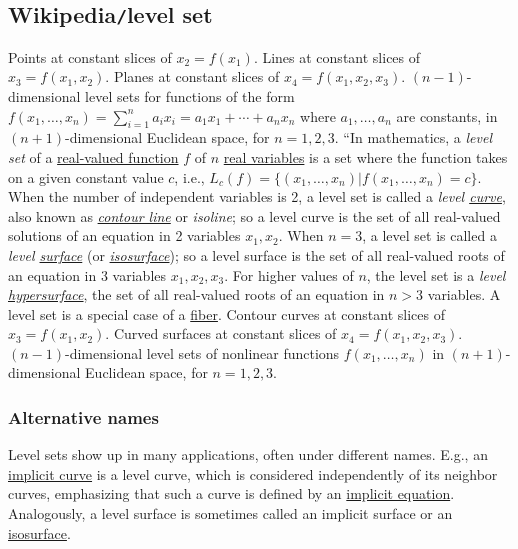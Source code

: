 \documentclass{article}
\begin{document}

\subsection{Wikipedia{\tt/}level set}
{\sf Points at constant slices of $x_2 = f(x_1)$. Lines at constant slices of $x_3 = f(x_1,x_2)$. Planes at constant slices of $x_4 = f(x_1,x_2,x_3)$. $(n - 1)$-dimensional level sets for functions of the form $f(x_1,\ldots,x_n) = \sum_{i=1}^n a_ix_i = a_1x_1 + \cdots + a_nx_n$ where $a_1,\ldots,a_n$ are constants, in $(n + 1)$-dimensional Euclidean space, for $n = 1,2,3$.} ``In mathematics, a {\it level set} of a \href{https://en.wikipedia.org/wiki/Real-valued_function}{real-valued function} $f$ of $n$ \href{https://en.wikipedia.org/wiki/Function_of_several_real_variables}{real variables} is a set where the function takes on a given constant value $c$, i.e., $L_c(f) = \{(x_1,\ldots,x_n)|f(x_1,\ldots,x_n) = c\}$. When the number of independent variables is 2, a level set is called a {\it level \href{https://en.wikipedia.org/wiki/Curve}{curve}}, also known as \href{https://en.wikipedia.org/wiki/Contour_line}{\it contour line} or {\it isoline}; so a level curve is the set of all real-valued solutions of an equation in 2 variables $x_1,x_2$. When $n = 3$, a level set is called a {\it level \href{https://en.wikipedia.org/wiki/Surface_(mathematics)}{surface}} (or \href{https://en.wikipedia.org/wiki/Isosurface}{\it isosurface}); so a level surface is the set of all real-valued roots of an equation in 3 variables $x_1,x_2,x_3$. For higher values of $n$, the level set is a {\it level \href{https://en.wikipedia.org/wiki/Hypersurface}{hypersurface}}, the set of all real-valued roots of an equation in $n > 3$ variables. A level set is a special case of a \href{https://en.wikipedia.org/wiki/Fiber_(mathematics)}{fiber}. {\sf Contour curves at constant slices of $x_3 = f(x_1,x_2)$. Curved surfaces at constant slices of $x_4 = f(x_1,x_2,x_3)$. $(n - 1)$-dimensional level sets of nonlinear functions $f(x_1,\ldots,x_n)$ in $(n + 1)$-dimensional Euclidean space, for $n = 1,2,3$.}

\subsubsection{Alternative names}
Level sets show up in many applications, often under different names. E.g., an \href{https://en.wikipedia.org/wiki/Implicit_curve}{implicit curve} is a level curve, which is considered independently of its neighbor curves, emphasizing that such a curve is defined by an \href{https://en.wikipedia.org/wiki/Implicit_equation}{implicit equation}. Analogously, a level surface is sometimes called an implicit surface or an \href{https://en.wikipedia.org/wiki/Isosurface}{isosurface}.
\end{document}
